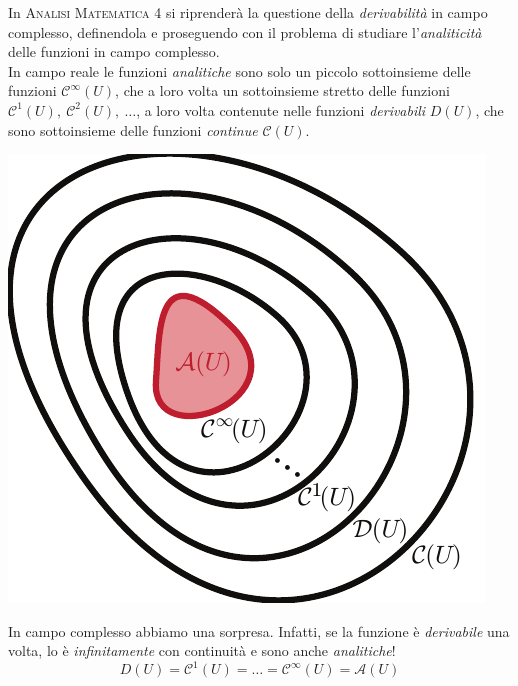 \begin{digressionwt}
	In \textsc{Analisi Matematica 4} si riprenderà la questione della \textit{derivabilità} in campo complesso, definendola e proseguendo con il problema di studiare l'\textit{analiticità} delle funzioni in campo complesso.\\
	In campo reale le funzioni \textit{analitiche} sono solo un piccolo sottoinsieme delle funzioni $\mathcal{C}^{\infty}\left(U\right)$, che a loro volta un sottoinsieme stretto delle funzioni $\mathcal{C}^1\left(U\right),\ \mathcal{C}^2\left(U\right),\ \ldots$, a loro volta contenute nelle funzioni \textit{derivabili} $D\left(U\right)$, che sono sottoinsieme delle funzioni \textit{continue} $\mathcal{C}\left(U\right)$.
\begin{center}
		\includegraphics[trim=0cm 0cm 0cm 0cm, clip, scale=0.45]{images/eulerovenn1.pdf}
\end{center}
	In campo complesso abbiamo una sorpresa. Infatti, se la funzione è \textit{derivabile} una volta, lo è \textit{infinitamente} con continuità e sono anche \textit{analitiche}!
	\begin{equation*}
		D\left(U\right)=\mathcal{C}^1\left(U\right)=\ldots=\mathcal{C}^{\infty}\left(U\right)=\mathcal{A}(U)
	\end{equation*}
\begin{center}

\end{center}
\end{digressionwt}
